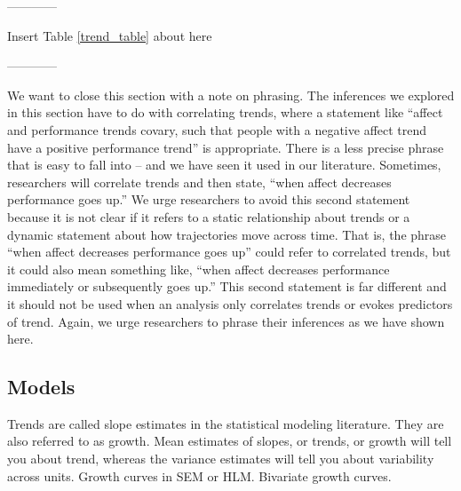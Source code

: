 \documentclass[english,,man]{apa6}
\theoremstyle{definition}
\theoremstyle{definition}
\theoremstyle{definition}
\theoremstyle{remark}
\begin{document}
\begin{center}

------------

Insert Table \ref{trend_table} about here

------------

\end{center}

We want to close this section with a note on phrasing. The inferences we
explored in this section have to do with correlating trends, where a
statement like \enquote{affect and performance trends covary, such that
people with a negative affect trend have a positive performance trend}
is appropriate. There is a less precise phrase that is easy to fall into
-- and we have seen it used in our literature. Sometimes, researchers
will correlate trends and then state, \enquote{when affect decreases
performance goes up.} We urge researchers to avoid this second statement
because it is not clear if it refers to a static relationship about
trends or a dynamic statement about how trajectories move across time.
That is, the phrase \enquote{when affect decreases performance goes up}
could refer to correlated trends, but it could also mean something like,
\enquote{when affect decreases performance immediately or subsequently
goes up.} This second statement is far different and it should not be
used when an analysis only correlates trends or evokes predictors of
trend. Again, we urge researchers to phrase their inferences as we have
shown here.

\hypertarget{models-1}{%
\subsection{Models}\label{models-1}}

Trends are called slope estimates in the statistical modeling
literature. They are also referred to as growth. Mean estimates of
slopes, or trends, or growth will tell you about trend, whereas the
variance estimates will tell you about variability across units. Growth
curves in SEM or HLM. Bivariate growth curves.
\end{document}
